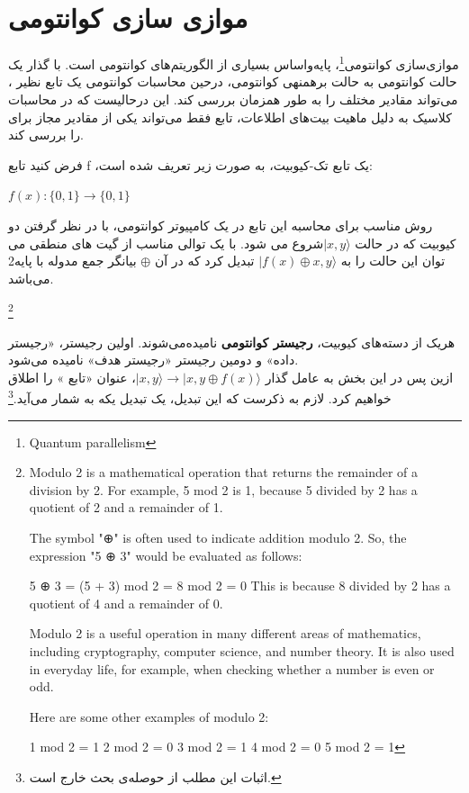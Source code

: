 \documentclass{book}
\begin{document}
\section{موازی سازی کوانتومی}

موازی‌سازی کوانتومی\footnote{Quantum parallelism}، پایه‌واساس بسیاری از الگوریتم‌های کوانتومی است. با گذار یک حالت کوانتومی به حالت برهمنهی کوانتومی، درحین محاسبات کوانتومی یک تابع نظیر ، می‌تواند مقادیر مختلف  را به طور همزمان بررسی کند. این درحالیست که در محاسبات کلاسیک به دلیل ماهیت بیت‌های اطلاعات، تابع  فقط می‌تواند یکی از مقادیر مجاز برای  را بررسی کند.


فرض کنید تابع f ،یک تابع تک-کیوبیت، به صورت زیر تعریف شده است:\\
\begin{center}
	$f (x) : \{0, 1\} \rightarrow \{0, 1\}$\\
\end{center}

روش مناسب برای محاسبه این تابع در یک کامپیوتر کوانتومی، با در نظر گرفتن دو کیوبیت که در حالت $\vert x, y\rangle$شروع می شود. با یک توالی مناسب از گیت های منطقی می توان این حالت را به $\vert f(x) \oplus x, y\rangle$ تبدیل کرد که در آن $\oplus$ بیانگر جمع مدوله با پایه‌2 می‌باشد.

\footnote{Modulo 2 is a mathematical operation that returns the remainder of a division by 2. For example, 5 mod 2 is 1, because 5 divided by 2 has a quotient of 2 and a remainder of 1.
	
	The symbol "⊕" is often used to indicate addition modulo 2. So, the expression "5 ⊕ 3" would be evaluated as follows:
	
	5 ⊕ 3 = (5 + 3) mod 2 = 8 mod 2 = 0
	This is because 8 divided by 2 has a quotient of 4 and a remainder of 0.
	
	Modulo 2 is a useful operation in many different areas of mathematics, including cryptography, computer science, and number theory. It is also used in everyday life, for example, when checking whether a number is even or odd.
	
	Here are some other examples of modulo 2:
	
	1 mod 2 = 1
	2 mod 2 = 0
	3 mod 2 = 1
	4 mod 2 = 0
	5 mod 2 = 1}

هریک از دسته‌های کیوبیت، \textbf{رجیستر کوانتومی} نامیده‌می‌شوند. اولین رجیستر، «رجیستر داده» و دومین رجیستر «رجیستر هدف» نامیده می‌شود.\\
ازین پس در این بخش به عامل گذار $\vert x, y \rangle \rightarrow \vert x, y \oplus f(x) \rangle$، عنوان «تابع » را اطلاق خواهیم کرد. لازم به ذکرست که این تبدیل، یک تبدیل یکه به شمار می‌آید.\footnote{اثبات این مطلب از حوصله‌ی بحث خارج است.}
\end{document}
